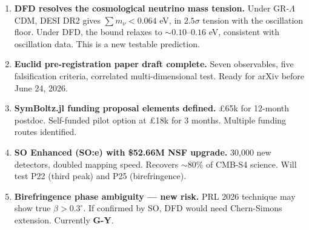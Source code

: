 \documentclass[11pt,a4paper]{article}
\newcommand{\GY}{\textcolor{dfdgy}{\textbf{G-Y}}}
\begin{document}
\begin{enumerate}
\item \textbf{DFD resolves the cosmological neutrino mass tension.} Under GR-$\Lambda$CDM, DESI DR2 gives $\sum m_\nu < 0.064$ eV, in $2.5\sigma$ tension with the oscillation floor. Under DFD, the bound relaxes to $\sim 0.10$--$0.16$ eV, consistent with oscillation data. This is a new testable prediction.

\item \textbf{Euclid pre-registration paper draft complete.} Seven observables, five falsification criteria, correlated multi-dimensional test. Ready for arXiv before June 24, 2026.

\item \textbf{SymBoltz.jl funding proposal elements defined.} \pounds 65k for 12-month postdoc. Self-funded pilot option at \pounds 18k for 3 months. Multiple funding routes identified.

\item \textbf{SO Enhanced (SO:e) with \$52.66M NSF upgrade.} 30,000 new detectors, doubled mapping speed. Recovers $\sim 80\%$ of CMB-S4 science. Will test P22 (third peak) and P25 (birefringence).

\item \textbf{Birefringence phase ambiguity --- new risk.} PRL 2026 technique may show true $\beta > 0.3^\circ$. If confirmed by SO, DFD would need Chern-Simons extension. Currently \GY.
\end{enumerate}
\end{document}
